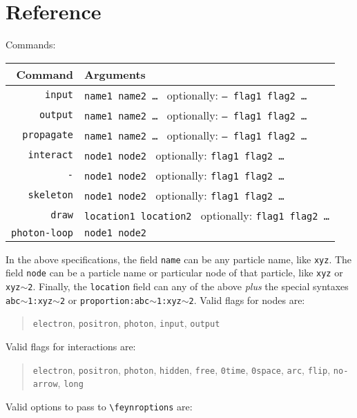 \documentclass[12pt]{article}
\begin{document}
\section*{Reference}
Commands:
\begin{center}
\begin{tabular}{r|l}
	Command & Arguments \\\hline
	\texttt{input} & \texttt{name1 name2 \dots} \ optionally: \texttt{-- flag1 flag2 \dots} \\
	\texttt{output} & \texttt{name1 name2 \dots} \ optionally: \texttt{-- flag1 flag2 \dots} \\
	\texttt{propagate} & \texttt{name1 name2 \dots} \ optionally: \texttt{-- flag1 flag2 \dots} \\
	\texttt{interact} & \texttt{node1 node2} \ optionally: \texttt{flag1 flag2 \dots} \\
	\texttt{-} & \texttt{node1 node2} \ optionally: \texttt{flag1 flag2 \dots} \\
	\texttt{skeleton} & \texttt{node1 node2} \ optionally: \texttt{flag1 flag2 \dots} \\
	\texttt{draw} & \texttt{location1 location2} \ optionally: \texttt{flag1 flag2 \dots} \\
	\texttt{photon-loop} & \texttt{node1 node2}
\end{tabular}
\end{center}
In the above specifications, the field \texttt{name} can be any particle name, like \texttt{xyz}.
The field \texttt{node} can be a particle name or particular node of that particle, like \texttt{xyz} or \texttt{xyz$\sim$2}.
Finally, the \texttt{location} field can any of the above \emph{plus} the special syntaxes \texttt{abc$\sim$1:xyz$\sim$2} or \texttt{proportion:abc$\sim$1:xyz$\sim$2}.
Valid flags for nodes are:
\begin{quote}
\texttt{electron}, \texttt{positron}, \texttt{photon}, \texttt{input}, \texttt{output}
\end{quote}
Valid flags for interactions are:
\begin{quote}
\texttt{electron}, \texttt{positron}, \texttt{photon}, \texttt{hidden}, \texttt{free}, \texttt{0time}, \texttt{0space}, \texttt{arc}, \texttt{flip}, \texttt{no-arrow}, \texttt{long}
\end{quote}
Valid options to pass to \texttt{\textbackslash{}feynroptions} are:
\end{document}
